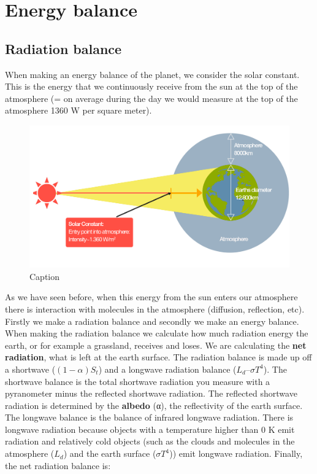 \documentclass[oneside]{book}
\begin{document}
\section{Energy balance}\label{energy-balance}

\subsection{Radiation balance}\label{radiation-balance}

When making an energy balance of the planet, we consider the solar
constant. This is the energy that we continuously receive from the sun
at the top of the atmosphere (= on average during the day we would
measure at the top of the atmosphere 1360 W per square meter).

\begin{figure}

{\centering \includegraphics[width=0.6\linewidth]{figures/Figure133} 

}

\caption{Caption}\label{fig:RadBalance}
\end{figure}

As we have seen before, when this energy from the sun enters our
atmosphere there is interaction with molecules in the atmosphere
(diffusion, reflection, etc). Firstly we make a radiation balance and
secondly we make an energy balance. When making the radiation balance we
calculate how much radiation energy the earth, or for example a
grassland, receives and loses. We are calculating the \textbf{net
radiation}, what is left at the earth surface. The radiation balance is
made up off a shortwave (\((1-α) S_t\)) and a longwave radiation balance
(\(L_d – σ T^4\)). The shortwave balance is the total shortwave
radiation you measure with a pyranometer minus the reflected shortwave
radiation. The reflected shortwave radiation is determined by the
\textbf{albedo} (α), the reflectivity of the earth surface. The longwave
balance is the balance of infrared longwave radiation. There is longwave
radiation because objects with a temperature higher than 0 K emit
radiation and relatively cold objects (such as the clouds and molecules
in the atmosphere (\(L_d\)) and the earth surface (\(σ T^4\))) emit
longwave radiation. Finally, the net radiation balance is:
\end{document}
